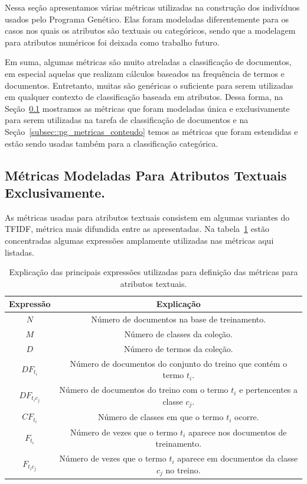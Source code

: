 Nessa seção apresentamos várias métricas utilizadas na construção dos indivíduos usados pelo Programa Genético. Elas foram modeladas diferentemente para os casos nos quais os atributos são textuais ou categóricos, sendo que a modelagem para atributos numéricos foi deixada como trabalho futuro. 

Em suma, algumas métricas são muito atreladas a classificação de documentos, em especial aquelas que realizam cálculos baseados na frequência de termos e documentos. 
Entretanto, muitas são genéricas o suficiente para serem utilizadas em qualquer contexto de classificação baseada em atributos.
Dessa forma, na Seção~\ref{subsec::pg_metricas_conteudo_textual} mostramos as métricas que foram modeladas única e exclusivamente para serem utilizadas na tarefa de classificação de documentos  e na Seção~\ref{subsec::pg_metricas_conteudo} temos as métricas que foram estendidas e estão sendo usadas também para a classificação categórica.

\subsection{Métricas Modeladas Para Atributos Textuais Exclusivamente.}
\label{subsec::pg_metricas_conteudo_textual}

As métricas usadas para atributos textuais consistem em algumas variantes do \textsc{TFIDF}, métrica mais difundida entre as apresentadas. Na tabela~\ref{table::metricas_textuais} estão concentradas algumas expressões amplamente utilizadas nas métricas aqui listadas.

\begin{table}[ht*]
\centering
\begin{tabular}{|c|c|}
\toprule
    \textbf{Expressão} & \textbf{Explicação} \\
\midrule
    $N$           & Número de documentos na base de treinamento. \tabularnewline \hline
    $M$           & Número de classes da coleção. \tabularnewline \hline
    $D$           & Número de termos da coleção. \tabularnewline \hline
    $DF_{t_i} $   & Número de documentos do conjunto do treino que contém o termo $t_i$. \tabularnewline \hline
    $DF_{t_ic_j}$ & Número de documentos do treino com o termo $t_i$ e pertencentes a classe $c_j$. \tabularnewline \hline
    $CF_{t_i}$    & Número de classes em que o termo $t_i$ ocorre. \tabularnewline \hline 
    $F_{t_i}$     & Número de vezes que o termo $t_i$ aparece nos documentos de treinamento. \tabularnewline \hline
    $F_{t_ic_j}$  & Número de vezes que o termo $t_i$ aparece em documentos da classe $c_j$ no treino. \tabularnewline 
\bottomrule
\end{tabular}
\caption{Explicação das principais expressões utilizadas para definição das métricas para atributos textuais.}
\label{table::metricas_textuais}
\end{table}


